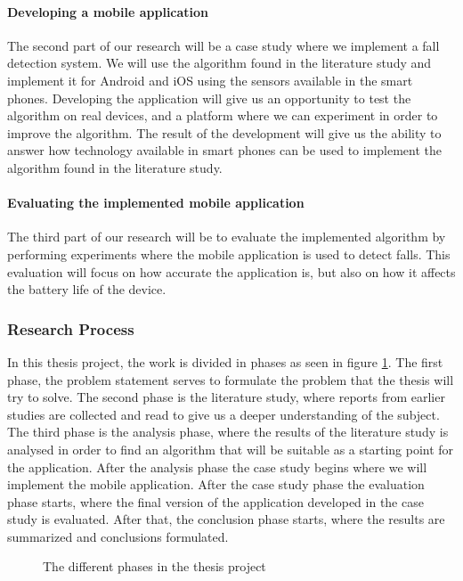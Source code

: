 \documentclass[12pt, a4paper, onecolumn]{article}
\begin{document}
	\paragraph{Developing a mobile application}
	The second part of our research will be a case study where we implement a fall detection system. We will use the algorithm found in the literature study and implement it for Android and iOS using the sensors available in the smart phones. Developing the application will give us an opportunity to test the algorithm on real devices, and a platform where we can experiment in order to improve the algorithm. The result of the development will give us the ability to answer how technology available in smart phones can be used to implement the algorithm found in the literature study.
	
	\paragraph{Evaluating the implemented mobile application}
	
	The third part of our research will be to evaluate the implemented algorithm by performing experiments where the mobile application is used to detect falls. This evaluation will focus on how accurate the application is, but also on how it affects the battery life of the device.
	
	\subsubsection{Research Process}
	
	In this thesis project, the work is divided in phases as seen in figure \ref{fig:research-process}. The first phase, the problem statement serves to formulate the problem that the thesis will try to solve. The second phase is the literature study, where reports from earlier studies are collected and read to give us a deeper understanding of the subject. The third phase is the analysis phase, where the results of the literature study is analysed in order to find an algorithm that will be suitable as a starting point for the application. After the analysis phase the case study begins where we will implement the mobile application. After the case study phase the evaluation phase starts, where the final version of the application developed in the case study is evaluated. After that, the conclusion phase starts, where the results are summarized and conclusions formulated. 
	
	\begin{figure}[h]
		\centering
		\caption{The different phases in the thesis project}%
		\label{fig:research-process}%
	\end{figure}
	
\end{document}
